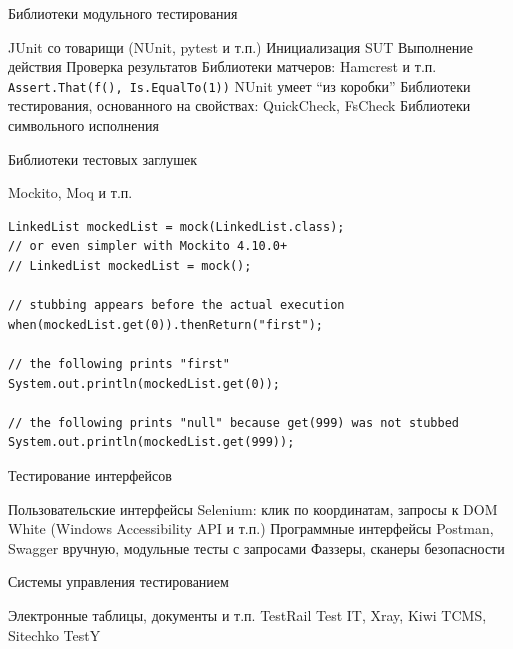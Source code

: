 \documentclass{../../slides-style}
\begin{document}
    \begin{frame}[fragile]{Библиотеки модульного тестирования}
        \begin{outline}
            \1 JUnit со товарищи (NUnit, pytest и т.п.)
                \2 Инициализация SUT
                \2 Выполнение действия
                \2 Проверка результатов
            \1 Библиотеки матчеров: Hamcrest и т.п.
                \2 \texttt{Assert.That(f(), Is.EqualTo(1))}
                \2 NUnit умеет \enquote{из коробки}
            \1 Библиотеки тестирования, основанного на свойствах: QuickCheck, FsCheck
            \1 Библиотеки символьного исполнения
        \end{outline}
    \end{frame}

    \begin{frame}[fragile]{Библиотеки тестовых заглушек}
        \begin{outline}
            \1 Mockito, Moq и т.п.
        \end{outline}
        \begin{verbatim}
LinkedList mockedList = mock(LinkedList.class);
// or even simpler with Mockito 4.10.0+
// LinkedList mockedList = mock();

// stubbing appears before the actual execution
when(mockedList.get(0)).thenReturn("first");

// the following prints "first"
System.out.println(mockedList.get(0));

// the following prints "null" because get(999) was not stubbed
System.out.println(mockedList.get(999));
        \end{verbatim}
    \end{frame}

    \begin{frame}{Тестирование интерфейсов}
        \begin{outline}
            \1 Пользовательские интерфейсы
                \2 Selenium: клик по координатам, запросы к DOM
                \2 White (Windows Accessibility API и т.п.)
            \1 Программные интерфейсы
                \2 Postman, Swagger вручную, модульные тесты с запросами
                \2 Фаззеры, сканеры безопасности
        \end{outline}
    \end{frame}

    \begin{frame}{Системы управления тестированием}
        \begin{outline}
            \1 Электронные таблицы, документы и т.п.
            \1 TestRail
            \1 Test IT, Xray, Kiwi TCMS, Sitechko
            \1 TestY
        \end{outline}
    \end{frame}
\end{document}
